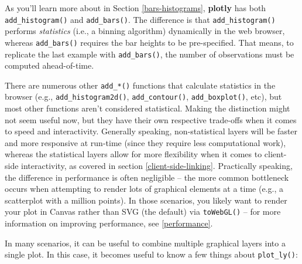 \documentclass[
  12pt,
]{krantz}
\newenvironment{Shaded}{\begin{snugshade}}{\end{snugshade}}
\newcommand{\DataTypeTok}[1]{\textcolor[rgb]{0.13,0.29,0.53}{#1}}
\newcommand{\KeywordTok}[1]{\textcolor[rgb]{0.13,0.29,0.53}{\textbf{#1}}}
\newcommand{\NormalTok}[1]{#1}
\newcommand{\OperatorTok}[1]{\textcolor[rgb]{0.81,0.36,0.00}{\textbf{#1}}}
\newcommand{\StringTok}[1]{\textcolor[rgb]{0.31,0.60,0.02}{#1}}
\begin{document}
As you'll learn more about in Section \ref{bars-histograms}, \textbf{plotly} has both \texttt{add\_histogram()} and \texttt{add\_bars()}. The difference is that \texttt{add\_histogram()} performs \emph{statistics} (i.e., a binning algorithm) dynamically in the web browser, whereas \texttt{add\_bars()} requires the bar heights to be pre-specified. That means, to replicate the last example with \texttt{add\_bars()}, the number of observations must be computed ahead-of-time.

\begin{Shaded}
\end{Shaded}

There are numerous other \texttt{add\_*()} functions that calculate statistics in the browser (e.g., \texttt{add\_histogram2d()}, \texttt{add\_contour()}, \texttt{add\_boxplot()}, etc), but most other functions aren't considered statistical. Making the distinction might not seem useful now, but they have their own respective trade-offs when it comes to speed and interactivity. Generally speaking, non-statistical layers will be faster and more responsive at run-time (since they require less computational work), whereas the statistical layers allow for more flexibility when it comes to client-side interactivity, as covered in section \ref{client-side-linking}. Practically speaking, the difference in performance is often negligible -- the more common bottleneck occurs when attempting to render lots of graphical elements at a time (e.g., a scatterplot with a million points). In those scenarios, you likely want to render your plot in Canvas rather than SVG (the default) via \texttt{toWebGL()} -- for more information on improving performance, see \ref{performance}.

In many scenarios, it can be useful to combine multiple graphical layers into a single plot. In this case, it becomes useful to know a few things about \texttt{plot\_ly()}:
\end{document}
